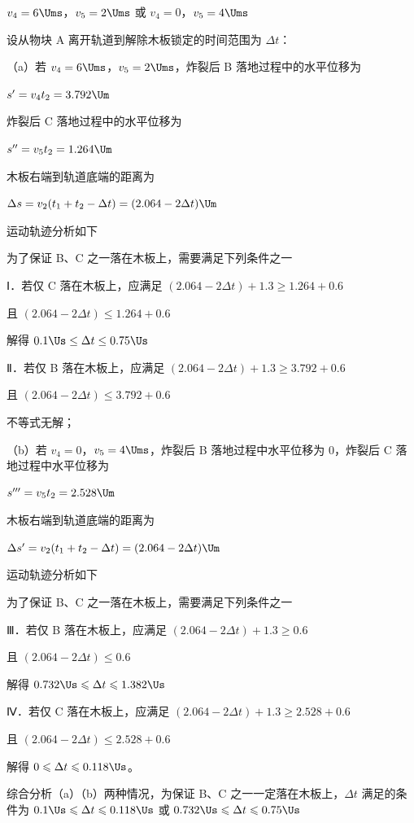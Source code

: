 \documentclass[\gkver]{gaokaozhenti}
\begin{document}
\begin{enumerate}
{$v_{4}=6\Ums$，$v_{5}=2\Ums$ 或 $v_{4}=0$，$v_{5}=4\Ums$

设从物块 A 离开轨道到解除木板锁定的时间范围为 $\Delta t$：

（a）若 $v_{4}=6\Ums$，$v_{5}=2\Ums$，炸裂后 B 落地过程中的水平位移为

$s'=v_{4}t_{2}=3.792\Um$

炸裂后 C 落地过程中的水平位移为

$s''=v_{5}t_{2}=1.264\Um$

木板右端到轨道底端的距离为

$\Delta s=v_{2}(t_{1}+t_{2}-\Delta t)=(2.064-2\Delta t)\Um$

运动轨迹分析如下


为了保证 B、C 之一落在木板上，需要满足下列条件之一

Ⅰ．若仅 C 落在木板上，应满足 $(2.064-2\Delta t)+1.3\geq1.264+0.6$

且 $(2.064-2\Delta t)\leq1.264+0.6$

解得 $0.1\Us\leq\Delta t\leq0.75\Us$

Ⅱ．若仅 B 落在木板上，应满足 $(2.064-2\Delta t)+1.3\geq3.792+0.6$

且 $(2.064-2\Delta t)\leq3.792+0.6$

不等式无解；

（b）若 $v_{4}=0$，$v_{5}=4\Ums$，炸裂后 B 落地过程中水平位移为 0，炸裂后 C 落地过程中水平位移为

$s'''=v_{5}t_{2}=2.528\Um$

木板右端到轨道底端的距离为

$\Delta s'=v_{2}(t_{1}+t_{2}-\Delta t)=(2.064-2\Delta t)\Um$

运动轨迹分析如下


为了保证 B、C 之一落在木板上，需要满足下列条件之一

Ⅲ．若仅 B 落在木板上，应满足 $(2.064-2\Delta t)+1.3\geq0.6$

且 $(2.064-2\Delta t)\leq0.6$

解得 $0.732\Us\leqslant\Delta t\leqslant1.382\Us$

Ⅳ．若仅 C 落在木板上，应满足 $(2.064-2\Delta t)+1.3\geq2.528+0.6$

且 $(2.064-2\Delta t)\leq2.528+0.6$

解得 $0\leqslant\Delta t\leqslant0.118\Us$。

综合分析（a）（b）两种情况，为保证 B、C 之一一定落在木板上，$\Delta t$ 满足的条件为 $0.1\Us\leqslant\Delta t\leqslant0.118\Us$ 或 $0.732\Us\leqslant\Delta t\leqslant0.75\Us$
}

\end{enumerate}
\end{document}
